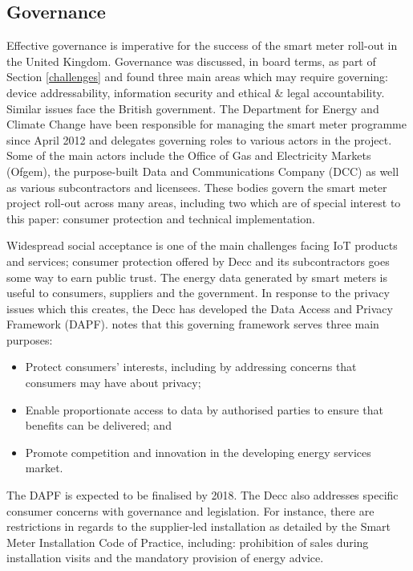     \subsection{Governance}
      Effective governance is imperative for the success of the smart meter roll-out in the United Kingdom. Governance was discussed, in board terms, as part of Section \ref{challenges} and found three main areas which may require governing: device addressability, information security and ethical \& legal accountability. Similar issues face the British government. The Department for Energy and Climate Change have been responsible for managing the smart meter programme since April 2012 and delegates governing roles to various actors in the project. Some of the main actors include the Office of Gas and Electricity Markets (Ofgem), the purpose-built Data and Communications Company (DCC) as well as various subcontractors and licensees. These bodies govern the smart meter project roll-out across many areas, including two which are of special interest to this paper: consumer protection and technical implementation.

      Widespread social acceptance is one of the main challenges facing IoT products and services; consumer protection offered by Decc and its subcontractors goes some way to earn public trust. The energy data generated by smart meters is useful to consumers, suppliers and the government. In response to the privacy issues which this creates, the Decc has developed the Data Access and Privacy Framework (DAPF). \citet{DataAccess:2015} notes that this governing framework serves three main purposes:

      \begin{itemize}
        \item{Protect consumers’ interests, including by addressing concerns that consumers may have about privacy;}
        \item{Enable proportionate access to data by authorised parties to ensure that benefits can be delivered; and}
        \item{Promote competition and innovation in the developing energy services market.}
      \end{itemize}

      The DAPF is expected to be finalised by 2018. The Decc also addresses specific consumer concerns with governance and legislation. For instance, there are restrictions in regards to the supplier-led installation as detailed by the Smart Meter Installation Code of Practice, including: prohibition of sales during installation visits and the mandatory provision of energy advice.


